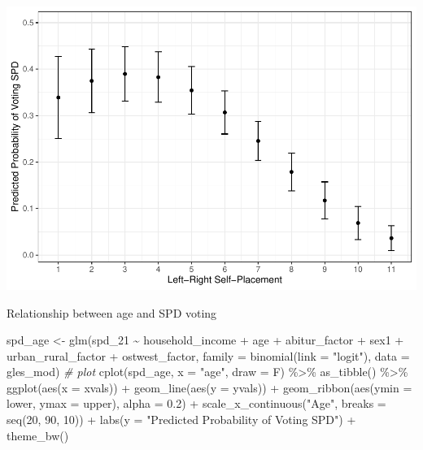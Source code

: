 \documentclass[
]{article}
\newenvironment{Shaded}{\begin{snugshade}}{\end{snugshade}}
\newcommand{\AttributeTok}[1]{\textcolor[rgb]{0.77,0.63,0.00}{#1}}
\newcommand{\CommentTok}[1]{\textcolor[rgb]{0.56,0.35,0.01}{\textit{#1}}}
\newcommand{\DecValTok}[1]{\textcolor[rgb]{0.00,0.00,0.81}{#1}}
\newcommand{\FloatTok}[1]{\textcolor[rgb]{0.00,0.00,0.81}{#1}}
\newcommand{\FunctionTok}[1]{\textcolor[rgb]{0.00,0.00,0.00}{#1}}
\newcommand{\NormalTok}[1]{#1}
\newcommand{\OtherTok}[1]{\textcolor[rgb]{0.56,0.35,0.01}{#1}}
\newcommand{\SpecialCharTok}[1]{\textcolor[rgb]{0.00,0.00,0.00}{#1}}
\newcommand{\StringTok}[1]{\textcolor[rgb]{0.31,0.60,0.02}{#1}}
\begin{document}
\includegraphics{AVCD_Final_Assignment-Edenhofer_files/figure-latex/spd-left-right-self-placement-1.pdf}

Relationship between age and SPD voting

\begin{Shaded}
\begin{Highlighting}[]
\NormalTok{spd\_age }\OtherTok{\textless{}{-}} \FunctionTok{glm}\NormalTok{(spd\_21 }\SpecialCharTok{\textasciitilde{}}\NormalTok{ household\_income }\SpecialCharTok{+}\NormalTok{ age }\SpecialCharTok{+}\NormalTok{ abitur\_factor }\SpecialCharTok{+}\NormalTok{ sex1 }\SpecialCharTok{+}\NormalTok{ urban\_rural\_factor }\SpecialCharTok{+}\NormalTok{ ostwest\_factor, }\AttributeTok{family =} \FunctionTok{binomial}\NormalTok{(}\AttributeTok{link =} \StringTok{"logit"}\NormalTok{), }\AttributeTok{data =}\NormalTok{ gles\_mod)}
\CommentTok{\# plot }
\FunctionTok{cplot}\NormalTok{(spd\_age, }\AttributeTok{x =} \StringTok{"age"}\NormalTok{, }\AttributeTok{draw =}\NormalTok{ F) }\SpecialCharTok{\%\textgreater{}\%}
  \FunctionTok{as\_tibble}\NormalTok{() }\SpecialCharTok{\%\textgreater{}\%}
  \FunctionTok{ggplot}\NormalTok{(}\FunctionTok{aes}\NormalTok{(}\AttributeTok{x =}\NormalTok{ xvals)) }\SpecialCharTok{+}
  \FunctionTok{geom\_line}\NormalTok{(}\FunctionTok{aes}\NormalTok{(}\AttributeTok{y =}\NormalTok{ yvals)) }\SpecialCharTok{+}
  \FunctionTok{geom\_ribbon}\NormalTok{(}\FunctionTok{aes}\NormalTok{(}\AttributeTok{ymin =}\NormalTok{ lower, }\AttributeTok{ymax =}\NormalTok{ upper), }\AttributeTok{alpha =} \FloatTok{0.2}\NormalTok{) }\SpecialCharTok{+}
  \FunctionTok{scale\_x\_continuous}\NormalTok{(}\StringTok{"Age"}\NormalTok{, }\AttributeTok{breaks =} \FunctionTok{seq}\NormalTok{(}\DecValTok{20}\NormalTok{, }\DecValTok{90}\NormalTok{, }\DecValTok{10}\NormalTok{)) }\SpecialCharTok{+}
  \FunctionTok{labs}\NormalTok{(}\AttributeTok{y =} \StringTok{"Predicted Probability of Voting SPD"}\NormalTok{) }\SpecialCharTok{+}
  \FunctionTok{theme\_bw}\NormalTok{()}
\end{Highlighting}
\end{Shaded}
\end{document}
